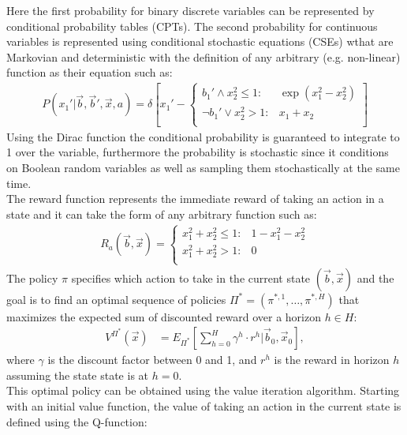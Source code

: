 \documentclass[letterpaper]{article}
\renewcommand{\-}{\text{-}}
\begin{document}
Here the first probability for binary discrete variables can be represented by conditional probability tables (CPTs). The second probability for continuous variables is represented using conditional stochastic equations (CSEs) wthat are Markovian and deterministic with the definition of any arbitrary (e.g. non-linear) function as their equation such as:
\vspace{-3mm}
{\footnotesize
\begin{align}
P(x_1' | \vec{b},\vec{b}',\vec{x},a) = \delta\left[ x_1' - 
\begin{cases}
b_1' \land x_2^2 \leq 1 : & \exp(x_1^2 - x_2^2) \\
\neg b_1' \lor  x_2^2 > 1 : & x_1 + x_2 \\
\end{cases}
\right] \label{eq:ex_csde}
\end{align}}
Using the Dirac function the conditional probability is guaranteed to integrate to 1 over the variable, furthermore the probability is stochastic since it conditions on Boolean random variables as well as sampling them stochastically at the same time. \\
The reward function represents the immediate reward of taking an action in a state and it can take the form of any arbitrary function such as:
\begin{align}
R_a(\vec{b},\vec{x}) = \begin{cases}
x_1^2 + x_2^2 \leq 1 : & 1 - x_1^2 - x_2^2  \\
x_1^2 + x_2^2 > 1 : & 0 \\
\end{cases} \label{eq:simple_reward}
\end{align}
The policy $\pi$ specifies which action to take in the current state  $(\vec{b},\vec{x})$ and the goal is to find an optimal sequence of policies
$\Pi^* = (\pi^{*,1},\ldots,\pi^{*,H})$ that maximizes the expected sum of discounted reward over a horizon $h \in H $: \\

\begin{align}
V^{\Pi^*}(\vec{x}) & = E_{\Pi^*} \left[ \sum_{h=0}^{H} \gamma^h \cdot r^h \Big| \vec{b}_0,\vec{x}_0 \right], \label{eq:vfun_def}
\end{align}
where $\gamma$ is the discount factor between 0 and 1, and  $r^h$ is the reward in horizon $h$ assuming the state state is at $h=0$.\\
This optimal policy can be obtained using the value iteration algorithm. Starting  with an initial value function, the value of taking an action in the current state is defined using the Q-function:  
\end{document}
